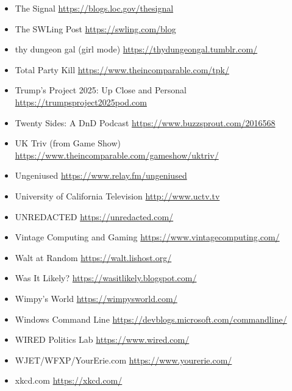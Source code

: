 \begin{itemize}
\item
  The Signal \url{https://blogs.loc.gov/thesignal}
\item
  The SWLing Post \url{https://swling.com/blog}
\item
  thy dungeon gal (girl mode) \url{https://thydungeongal.tumblr.com/}
\item
  Total Party Kill \url{https://www.theincomparable.com/tpk/}
\item
  Trump's Project 2025: Up Close and Personal
  \url{https://trumpsproject2025pod.com}
\item
  Twenty Sides: A DnD Podcast \url{https://www.buzzsprout.com/2016568}
\item
  UK Triv (from Game Show)
  \url{https://www.theincomparable.com/gameshow/uktriv/}
\item
  Ungeniused \url{https://www.relay.fm/ungeniused}
\item
  University of California Television \url{http://www.uctv.tv}
\item
  UNREDACTED \url{https://unredacted.com/}
\item
  Vintage Computing and Gaming \url{https://www.vintagecomputing.com/}
\item
  Walt at Random \url{https://walt.lishost.org/}
\item
  Was It Likely? \url{https://wasitlikely.blogspot.com/}
\item
  Wimpy's World \url{https://wimpysworld.com/}
\item
  Windows Command Line \url{https://devblogs.microsoft.com/commandline/}
\item
  WIRED Politics Lab \url{https://www.wired.com/}
\item
  WJET/WFXP/YourErie.com \url{https://www.yourerie.com/}
\item
  xkcd.com \url{https://xkcd.com/}
\end{itemize}
